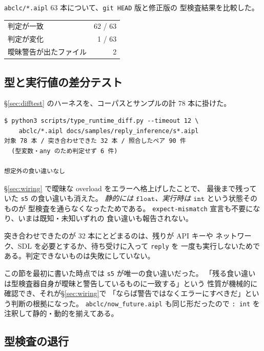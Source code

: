 \documentclass[11pt,a4paper]{ltjsarticle}
\theoremstyle{definition}
\theoremstyle{remark}
\newcommand{\ty}[1]{\ensuremath{\mathtt{#1}}}
\begin{document}
\texttt{abclc/*.aipl} 63 本について、\texttt{git HEAD} 版と修正版の
型検査結果を比較した。

\begin{center}
\begin{tabular}{@{}lr@{}}
\toprule
判定が一致 & 62 / 63 \\
判定が変化 & 1 / 63 \\
曖昧警告が出たファイル & 2 \\
\bottomrule
\end{tabular}
\end{center}

\subsection{型と実行値の差分テスト}

\S\ref{sec:difftest} のハーネスを、コーパスとサンプルの計 78 本に掛けた。

\begin{lstlisting}[language={}]
$ python3 scripts/type_runtime_diff.py --timeout 12 \
    abclc/*.aipl docs/samples/reply_inference/s*.aipl
対象 78 本 / 突き合わせできた 32 本 / 照合したペア 90 件
  (型変数・any のため判定せず 6 件)

想定外の食い違いなし
\end{lstlisting}

\S\ref{sec:wiring} で曖昧な overload をエラーへ格上げしたことで、
最後まで残っていた \texttt{s5} の食い違いも消えた。
\emph{静的には \ty{float}、実行時は \ty{int}} という状態そのものが
型検査を通らなくなったためである。
\texttt{expect-mismatch} 宣言も不要になり、いまは既知・未知いずれの
食い違いも報告されない。

突き合わせできたのが 32 本にとどまるのは、残りが API キーや
ネットワーク、SDL を必要とするか、待ち受けに入って \texttt{reply} を
一度も実行しないためである。判定できないものは失敗にしていない。

この節を最初に書いた時点では \texttt{s5} が唯一の食い違いだった。
「残る食い違いは型検査器自身が曖昧と警告しているものに一致する」という
性質が機械的に確認でき、それが\S\ref{sec:wiring}で
「ならば警告ではなくエラーにすべきだ」という判断の根拠になった。
\texttt{abclc/now\_future.aipl} も同じ形だったので \texttt{: int} を
注釈して静的・動的を揃えてある。

\subsection{型検査の退行}
\end{document}
